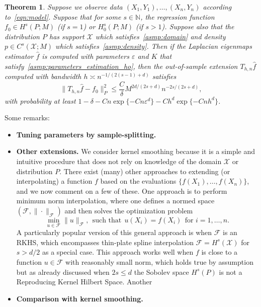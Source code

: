 \documentclass{article}
\newcommand{\1}{\mathbf{1}}
\newcommand{\mc}[1]{\mathcal{#1}}
\newcommand{\wh}[1]{\widehat{#1}}
\theoremstyle{alden}
\theoremstyle{aldenthm}
\newtheorem{theorem}{Theorem}
\theoremstyle{definition}
\theoremstyle{remark}
\begin{document}
\begin{theorem}
	\label{thm:laplacian_eigenmaps_estimation_out_of_sample}
	Suppose we observe data $(X_1,Y_1),\ldots,(X_n,Y_n)$ according to~\eqref{eqn:model}. Suppose that for some $s \in \mathbb{N}$, the regression function $f_0 \in H^s(P;M)$ (if $s = 1$) or $H_0^s(P;M)$ (if $s > 1$). Suppose also that the distribution $P$ has support $\mc{X}$ which satisfies~\ref{asmp:domain} and density $p \in C^s(\mc{X};M)$ which satisfies~\ref{asmp:density}. Then if the Laplacian eigenmaps estimator $\wh{f}$ is computed with parameters $\varepsilon$ and $K$ that satisfy~\ref{asmp:parameters_estimation_ho}, then the out-of-sample extension $T_{h,n}\wh{f}$ computed with bandwidth $h \asymp n^{-1/(2(s - 1) + d)}$ satisfies
	\begin{equation*}
	\|T_{h,n}\wh{f} - f_0\|_P^2 \leq \frac{C}{\delta}M^{2d/(2s + d)}n^{-2s/(2s + d)},
	\end{equation*}
	with probability at least $1 - \delta - Cn\exp\{-Cn\varepsilon^d\} - Ch^d\exp\{-Cnh^d\}$. 
\end{theorem}
Some remarks:
\begin{itemize}
	\item \textbf{Tuning parameters by sample-splitting.} 
	\item \textbf{Other extensions.} We consider kernel smoothing because it is a simple and intuitive procedure that does not rely on knowledge of the domain $\mc{X}$ or distribution $P$. There exist (many) other approaches to extending (or interpolating) a function $f$ based on the evaluations $\{f(X_1),\ldots,f(X_n)\}$, and we now comment on a few of these. One approach is to perform minimum norm interpolation, where one defines a normed space $(\mc{F},\|\cdot\|_{\mc{F}})$ and then solves the optimization problem
	\begin{equation*}
	\min_{u \in \mc{F}} \|u\|_{\mc{F}},~~\textrm{such that}~~ u(X_i) =  f(X_i)~~\textrm{for $i = 1,\ldots,n$.}
	\end{equation*}
	A particularly popular version of this general approach is when $\mc{F}$ is an RKHS, which encompasses thin-plate spline interpolation $\mc{F} = H^s(\mc{X})$ for $s > d/2$ as a special case. This approach works well when $f$ is close to a function $u \in \mc{F}$ with reasonably small norm, which holds true by assumption  but as already discussed when $2s \leq d$ the Sobolev space $H^s(P)$ is not a Reproducing Kernel Hilbert Space. Another 
	\item \textbf{Comparison with kernel smoothing.} 
\end{itemize}
\end{document}
